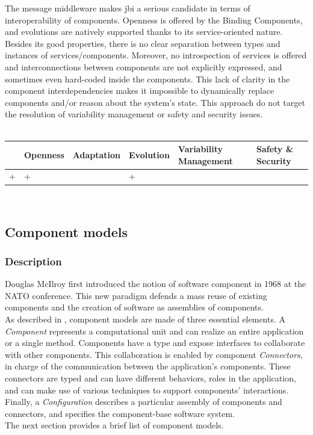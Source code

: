 The message middleware makes \gls{jbi} a serious candidate in terms of interoperability of components. Openness is offered by the Binding Components, and evolutions are natively supported thanks to its service-oriented nature.
Besides its good properties, there is no clear separation between types and instances of services/components. Moreover, no introspection of services is offered and interconnections between components are not explicitly expressed, and sometimes even hard-coded inside the components.
This lack of clarity in the component interdependencies makes it impossible to dynamically replace components and/or reason about the system's state. This approach do not target the resolution of variability management or safety and security issues.\\
 \\
\begin{tabular}{ >{\centering}m{}| >{\centering}m{} >{\centering}m{}| >{\centering}m{} >{\centering}m{}| >{\centering\arraybackslash}m{}}
{\tiny Interoperability} & {\tiny Openness} & {\tiny Adaptation} & {\tiny Evolution} & {\tiny Variability Management} & {\tiny Safety \& Security}\\
 \hline
 + & + &  & + &  & \\ 
  \hline
\end{tabular}\\


\subsection{Component models}
\label{sec:componentModelStateOfArt}
\vspace{0.3cm}


\subsubsection{Description}

Douglas McIlroy first introduced the notion of software component in 1968 at the NATO conference. This new paradigm defends a mass reuse of existing components and the creation of software as assemblies of components.\\
As described in \cite{Medvidovic:2000}, component models are made of three essential elements. A {\it Component} represents a computational unit and can realize an entire application or a single method. Components have a type and expose interfaces to collaborate with other components. This collaboration is enabled by component {\it Connectors}, in charge of the communication between the application's components. These connectors are typed and can have different behaviors, roles in the application, and can make use of various techniques to support components' interactions. Finally, a {\it Configuration} describes a particular assembly of components and connectors, and specifies the component-base software system.\\
The next section provides a brief list of component models.\\

